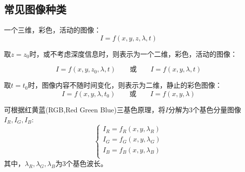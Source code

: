 \documentclass[11pt]{article}
\begin{document}
\subsection{常见图像种类}
\begin{figure}[h]
	\centering
\end{figure}
一个三维，彩色，活动的图像：
$$I = f(x,y,z,\lambda,t)$$

取$z=z_0$时，或不考虑深度信息时，则表示为一个二维，彩色，活动的图像：

$$I = f(x,y,z_0,\lambda,t)\qquad \text{或} \qquad I = f(x,y,\lambda,t)$$

取$t=t_0$时，图像内容不随时间变化，则表示为二维，静止的彩色图像：
$$I = f(x,y,\lambda,t_0) \qquad \text{或} \qquad I = f(x,y,\lambda)$$

可根据红黄蓝(RGB,Red Green Blue)三基色原理，将$I$分解为3个基色分量图像$I_R,I_G,I_B$:
$$
\left\{\begin{matrix}
	I_R = f_R(x,y,\lambda_R) \\ 
	I_G = f_G(x,y,\lambda_G) \\
	I_B = f_B(x,y,\lambda_B) \\
\end{matrix}\right.
$$
其中，$\lambda_R,\lambda_G,\lambda_B$为3个基色波长。
\end{document}
